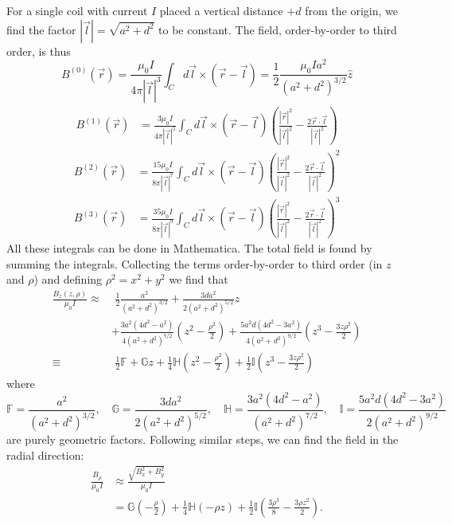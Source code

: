 \documentclass{book}
\theoremstyle{definition}
\newcommand{\f}[2]{\frac{#1}{#2}}
\newcommand{\lp}{\left(}
\newcommand{\rp}{\right)}
\begin{document}
For a single coil with current $I$ placed a vertical distance $+d$ from the origin, we find the factor $|\vec{l}| = \sqrt{a^2 + d^2}$ to be constant. The field, order-by-order to third order, is thus  
\begin{equation*}
B^{(0)}(\vec{r}) = \f{\mu_0 I}{4\pi |\vec{l}|^3}\int_C d\vec{l}\times (\vec{r} - \vec{l}) = \f{1}{2}\f{\mu_0 I a^2}{(a^2 + d^2)^{3/2}} \hat{z}
\end{equation*}
\begin{align*}
B^{(1)}(\vec{r}) 
&= \f{3\mu_0 I}{4\pi |\vec{l}|^5}\int_C d\vec{l}\times (\vec{r} - \vec{l}) \lp \f{|\vec{r}|^2}{|\vec{l}|^2} - \f{2\vec{r}\cdot\vec{l}}{|\vec{l}|^2} \rp
\end{align*}
\begin{align*}
B^{(2)}(\vec{r}) 
&= \f{15\mu_0 I}{8\pi |\vec{l}|^7}\int_C d\vec{l}\times (\vec{r} - \vec{l}) \lp \f{|\vec{r}|^2}{|\vec{l}|^2} - \f{2\vec{r}\cdot\vec{l}}{|\vec{l}|^2} \rp^2
\end{align*}
\begin{align*}
B^{(3)}(\vec{r}) &= \f{35\mu_0 I}{8\pi |\vec{l}|^9}\int_C d\vec{l}\times (\vec{r} - \vec{l}) \lp \f{|\vec{r}|^2}{|\vec{l}|^2} - \f{2\vec{r}\cdot\vec{l}}{|\vec{l}|^2} \rp^3
\end{align*}
All these integrals can be done in Mathematica. The total field is found by summing the integrals. Collecting the terms order-by-order to third order (in $z$ and $\rho$) and defining $\rho^2 = x^2 + y^2$ we find that
\begin{align*}
\f{B_z(z,\rho)}{\mu_0 I} \approx &\,\,\f{1}{2}\f{a^2}{(a^2+d^2)^{3/2}} + \f{3da^2}{2(a^2+d^2)^{5/2}}z 
\\
&+ \f{3a^2(4d^2 - a^2)}{4(a^2+d^2)^{7/2}} \lp z^2 - \f{\rho^2}{2} \rp
+\f{5 a^2 d (4d^2 - 3 a^2)}{4 (a^2 + d^2)^{9/2}}\lp z^3 - \f{3 z\rho^2}{2}\rp\\
\equiv&\,\, \f{1}{2}\mathbb{F} + \mathbb{G}z + \f{1}{4}\mathbb{H}\lp z^2 - \f{\rho^2}{2} \rp + \f{1}{2} \mathbb{I}\lp z^3 - \f{3 z\rho^2}{2}\rp
\end{align*}
where 
\begin{equation*}
\mathbb{F} = \f{a^2}{(a^2+d^2)^{3/2}}, \quad 
\mathbb{G} = \f{3da^2}{2(a^2+d^2)^{5/2}}, \quad 
\mathbb{H} = \f{3a^2(4d^2-a^2)}{(a^2+d^2)^{7/2}},\quad
\mathbb{I} = \f{5 a^2 d (4 d^2-3a^2)}{2(a^2 + d^2)^{9/2}} 
\end{equation*}
are purely geometric factors. Following similar steps, we can find the field in the radial direction:
\begin{align*}
\f{B_\rho}{\mu_0 I} 
&\approx \f{\sqrt{B_x^2 + B_y^2}}{\mu_0 I} \\
&= \mathbb{G}\lp -\f{\rho}{2} \rp + \f{1}{4}\mathbb{H}(-\rho z) + \f{1}{2}\mathbb{I}\lp \f{3\rho^3}{8} - \f{3\rho z^2}{2} \rp.
\end{align*}
\end{document}
